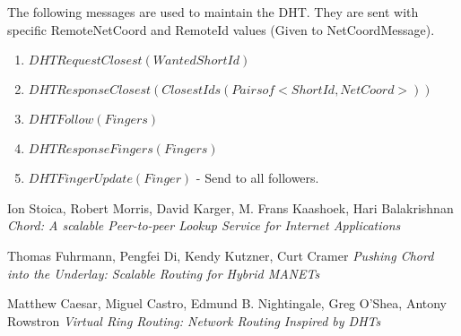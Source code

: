 \documentclass{amsart}
\theoremstyle{definition}
\theoremstyle{remark}
\numberwithin{equation}{section}
\begin{document}

The following messages are used to maintain the DHT. They are sent with specific
RemoteNetCoord and RemoteId values (Given to NetCoordMessage).

\begin{enumerate}
  \item $DHTRequestClosest(WantedShortId)$
  \item $DHTResponseClosest(ClosestIds(Pairs of <ShortId, NetCoord>))$
  \item $DHTFollow(Fingers)$
  \item $DHTResponseFingers(Fingers)$
  \item $DHTFingerUpdate(Finger)$ - Send to all followers.
\end{enumerate}





\begin{thebibliography}{9}
Ion Stoica, Robert Morris, David Karger, M. Frans Kaashoek, Hari Balakrishnan
\textit{Chord: A scalable Peer-to-peer Lookup Service for Internet Applications}

Thomas Fuhrmann, Pengfei Di, Kendy Kutzner, Curt Cramer
\textit{Pushing Chord into the Underlay: Scalable Routing for Hybrid MANETs}

  Matthew Caesar, Miguel Castro, Edmund B. Nightingale, Greg O'Shea, Antony Rowstron
\textit{Virtual Ring Routing: Network Routing Inspired by DHTs}
\\

\end{thebibliography}
\end{document}
